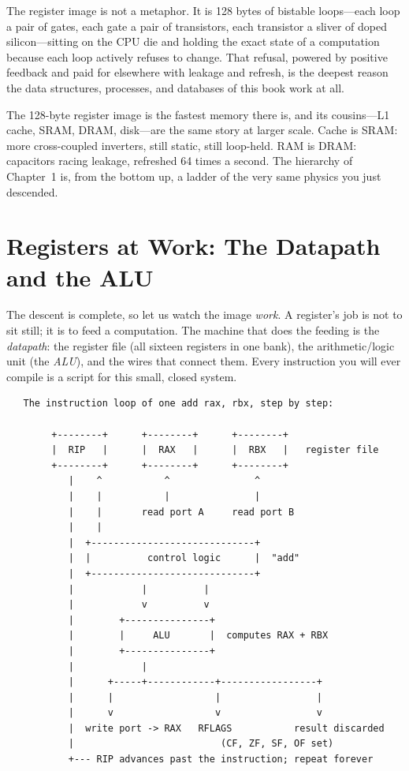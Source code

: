 The register image is not a metaphor. It is 128 bytes of bistable
loops---each loop a pair of gates, each gate a pair of transistors,
each transistor a sliver of doped silicon---sitting on the CPU die
and holding the exact state of a computation because each loop
actively refuses to change. That refusal, powered by positive
feedback and paid for elsewhere with leakage and refresh, is the
deepest reason the data structures, processes, and databases of this
book work at all.

\begin{insight}
The 128-byte register image is the fastest memory there is, and its
cousins---L1 cache, SRAM, DRAM, disk---are the same story at larger
scale. Cache is SRAM: more cross-coupled inverters, still static,
still loop-held. RAM is DRAM: capacitors racing leakage, refreshed
64 times a second. The hierarchy of Chapter~1 is, from the bottom up,
a ladder of the very same physics you just descended.
\end{insight}

\section{Registers at Work: The Datapath and the ALU}
\label{sec:datapath}

The descent is complete, so let us watch the image \emph{work}. A
register's job is not to sit still; it is to feed a computation. The
machine that does the feeding is the \emph{datapath}: the register
file (all sixteen registers in one bank), the arithmetic/logic unit
(the \emph{ALU}), and the wires that connect them. Every instruction
you will ever compile is a script for this small, closed system.

\begin{verbatim}
   The instruction loop of one add rax, rbx, step by step:

        +--------+      +--------+      +--------+
        |  RIP   |      |  RAX   |      |  RBX   |   register file
        +--------+      +--------+      +--------+
           |    ^           ^               ^
           |    |           |               |
           |    |       read port A     read port B
           |    |
           |  +-----------------------------+
           |  |          control logic      |  "add"
           |  +-----------------------------+
           |            |          |
           |            v          v
           |        +---------------+
           |        |     ALU       |  computes RAX + RBX
           |        +---------------+
           |            |
           |      +-----+------------+-----------------+
           |      |                  |                 |
           |      v                  v                 v
           |  write port -> RAX   RFLAGS           result discarded
           |                          (CF, ZF, SF, OF set)
           +--- RIP advances past the instruction; repeat forever
\end{verbatim}

